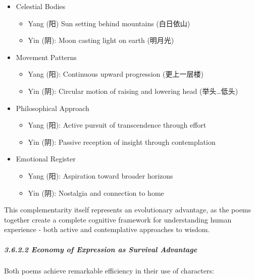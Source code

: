 \documentclass[
  11pt,
  letterpaper,
]{article}
\providecommand{\tightlist}{%
  \setlength{\itemsep}{0pt}\setlength{\parskip}{0pt}}
\begin{document}
\begin{itemize}
\tightlist
\item
  Celestial Bodies

  \begin{itemize}
  \tightlist
  \item
    Yang (阳) Sun setting behind mountains (白日依山)
  \item
    Yin (阴): Moon casting light on earth (明月光)
  \end{itemize}
\item
  Movement Patterns

  \begin{itemize}
  \tightlist
  \item
    Yang (阳): Continuous upward progression (更上一层楼)
  \item
    Yin (阴): Circular motion of raising and lowering head
    (举头\ldots 低头)
  \end{itemize}
\item
  Philosophical Approach

  \begin{itemize}
  \tightlist
  \item
    Yang (阳): Active pursuit of transcendence through effort
  \item
    Yin (阴): Passive reception of insight through contemplation
  \end{itemize}
\item
  Emotional Register

  \begin{itemize}
  \tightlist
  \item
    Yang (阳): Aspiration toward broader horizons
  \item
    Yin (阴): Nostalgia and connection to home
  \end{itemize}
\end{itemize}

This complementarity itself represents an evolutionary advantage, as the
poems together create a complete cognitive framework for understanding
human experience - both active and contemplative approaches to wisdom.

\hypertarget{economy-of-expression-as-survival-advantage}{%
\subparagraph{3.6.2.2 Economy of Expression as Survival
Advantage}\label{economy-of-expression-as-survival-advantage}}

Both poems achieve remarkable efficiency in their use of characters:
\end{document}
